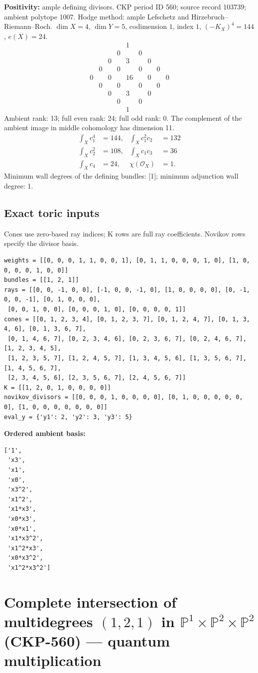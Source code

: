 \documentclass[10pt,a4paper]{article}
\newcommand{\hodge}[4]{\begin{array}{ccccccccc}
&&&&1&&&&\\&&&0&&0&&&\\&&0&&#1&&0&&\\&0&&#2&&#2&&0&\\
0&&#3&&#4&&#3&&0\\&0&&#2&&#2&&0&\\&&0&&#1&&0&&\\&&&0&&0&&&\\&&&&1&&&&\end{array}}
\begin{document}
\textbf{Positivity:} ample defining divisors.
CKP period ID 560; source record 103739; ambient polytope 1007.
Hodge method: ample Lefschetz and Hirzebruch--Riemann--Roch.
$\dim X=4$, $\dim Y=5$, codimension $1$, index $1$, $(-K_X)^4=144$, $e(X)=24$.
\[\hodge{3}{0}{0}{16}\]
Ambient rank: 13; full even rank: 24; full odd rank: 0. The complement of the ambient image in middle cohomology has dimension 11.
\[\begin{aligned}\int_Xc_1^4&=144,&\int_Xc_1^2c_2&=132\\\int_Xc_2^2&=108,&\int_Xc_1c_3&=36\\\int_Xc_4&=24,&\chi(\mathcal O_X)&=1.\end{aligned}\]
Minimum wall degrees of the defining bundles: [1]; minimum adjunction wall degree: 1.
\subsection*{Exact toric inputs}
Cones use zero-based ray indices; K rows are full ray coefficients. Novikov rows specify the divisor basis.

\begin{lstlisting}
weights = [[0, 0, 0, 1, 1, 0, 0, 1], [0, 1, 1, 0, 0, 0, 1, 0], [1, 0, 0, 0, 0, 1, 0, 0]]
bundles = [[1, 2, 1]]
rays = [[0, 0, -1, 0, 0], [-1, 0, 0, -1, 0], [1, 0, 0, 0, 0], [0, -1, 0, 0, -1], [0, 1, 0, 0, 0],
 [0, 0, 1, 0, 0], [0, 0, 0, 1, 0], [0, 0, 0, 0, 1]]
cones = [[0, 1, 2, 3, 4], [0, 1, 2, 3, 7], [0, 1, 2, 4, 7], [0, 1, 3, 4, 6], [0, 1, 3, 6, 7],
 [0, 1, 4, 6, 7], [0, 2, 3, 4, 6], [0, 2, 3, 6, 7], [0, 2, 4, 6, 7], [1, 2, 3, 4, 5],
 [1, 2, 3, 5, 7], [1, 2, 4, 5, 7], [1, 3, 4, 5, 6], [1, 3, 5, 6, 7], [1, 4, 5, 6, 7],
 [2, 3, 4, 5, 6], [2, 3, 5, 6, 7], [2, 4, 5, 6, 7]]
K = [[1, 2, 0, 1, 0, 0, 0, 0]]
novikov_divisors = [[0, 0, 0, 1, 0, 0, 0, 0], [0, 1, 0, 0, 0, 0, 0, 0], [1, 0, 0, 0, 0, 0, 0, 0]]
eval_y = {'y1': 2, 'y2': 3, 'y3': 5}
\end{lstlisting}

\textbf{Ordered ambient basis:}
\begin{lstlisting}
['1',
 'x3',
 'x1',
 'x0',
 'x3^2',
 'x1^2',
 'x1*x3',
 'x0*x3',
 'x0*x1',
 'x1*x3^2',
 'x1^2*x3',
 'x0*x3^2',
 'x1^2*x3^2']
\end{lstlisting}

\clearpage\section*{Complete intersection of multidegrees $(1,2,1)$ in $\mathbb P^{1}\times \mathbb P^{2}\times \mathbb P^{2}$ (CKP-560) --- quantum multiplication}
\end{document}
